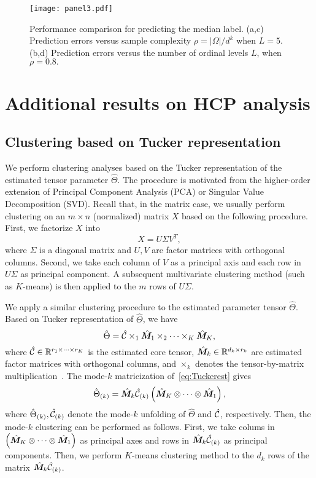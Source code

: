 \documentclass[11pt]{article}
\theoremstyle{plain}
\theoremstyle{definition}
\begin{document}
\begin{figure}[H]
  \begin{center}
    \texttt{[image: panel3.pdf]}
  \end{center}
  \caption{Performance comparison for predicting the median label. (a,c) Prediction errors versus sample complexity $\rho=|\Omega|/d^k$ when $L=5$. (b,d) Prediction errors versus the number of ordinal levels $L$, when $\rho=0.8.$}
\end{figure}

\section{Additional results on HCP analysis}
\subsection{Clustering based on Tucker representation}\label{sec:clustering}
We perform clustering analyses based on the Tucker representation of the estimated tensor parameter $\hat\Theta$. The procedure is motivated from the higher-order extension of Principal Component Analysis (PCA) or Singular Value Decomposition (SVD). Recall that, in the matrix case, we usually perform clustering on an $m\times n$ (normalized) matrix $X$ based on the following procedure. First, we factorize $X$ into
\begin{equation}
X = U\Sigma V^T,
\end{equation}
where $\Sigma$ is a diagonal matrix and $ U,V$ are factor matrices with orthogonal columns. Second, we take each column of $V$ as a principal axis and each row in $U\Sigma$ as principal component. A subsequent multivariate clustering method (such as $K$-means) is then applied to the $m$ rows of $U\Sigma$. 


We apply a similar clustering procedure to the estimated parameter tensor $\hat\Theta$. Based on Tucker representation of $\hat \Theta$, we have
\begin{equation}\label{eq:Tuckerest}
\hat \Theta = \hat {\mathcal{C}}\times_1\hat {\bm M}_1\times_2\cdots\times_K\hat {\bm M}_K,
\end{equation}
where $\hat {\mathcal{C}}\in\mathbb{R}^{r_1\times \cdots \times r_K}$ is the estimated core tensor, $\hat {\bm M}_k\in\mathbb{R}^{d_k\times r_k}$ are estimated factor matrices with orthogonal columns, and $\times_k$ denotes the tensor-by-matrix multiplication~\citep{kolda2009tensor}. The mode-$k$ matricization of~\eqref{eq:Tuckerest} gives
\begin{equation}
\hat \Theta_{(k)} = \hat {\bm M}_k\hat {\mathcal{C}}_{(k)}\left(\hat {\bm M}_K\otimes\cdots\otimes\hat {\bm M}_1\right),
\end{equation}
where $\hat \Theta_{(k)} , \hat {\mathcal{C}}_{(k)}$ denote the mode-$k$ unfolding of $\hat \Theta$ and $\hat {\mathcal{C}}$, respectively. Then, the mode-$k$ clustering can be performed as follows. First, we take colums in $\left(\hat {\bm M}_K\otimes\cdots\otimes\hat {\bm M}_1\right)$ as principal axes and rows in $\hat {\bm M}_k\hat {\mathcal{C}}_{(k)}$ as principal components. Then, we perform $K$-means clustering method to the $d_k$ rows of the matrix $\hat {\bm M}_k\hat {\mathcal{C}}_{(k)}$. 
\end{document}
